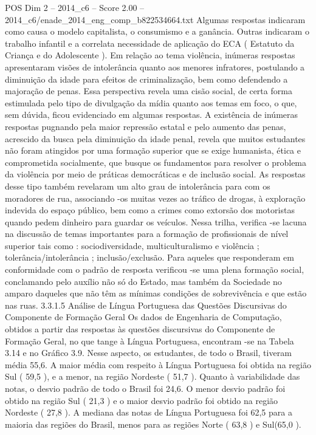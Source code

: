 \begin{textsample}{POS Dim 2 – 2014\_c6 – Score 2.00 – 2014\_c6/enade\_2014\_eng\_comp\_b822534664.txt}
Algumas respostas indicaram como causa o modelo capitalista, o consumismo e a ganância.
Outras indicaram o trabalho infantil e a correlata necessidade de aplicação do ECA ( Estatuto da Criança e do Adolescente ).
Em relação ao tema violência, inúmeras respostas apresentaram visões de intolerância quanto aos menores infratores, postulando a diminuição da idade para efeitos de criminalização, bem como defendendo a majoração de penas.
Essa perspectiva revela uma cisão social, de certa forma estimulada pelo tipo de divulgação da mídia quanto aos temas em foco, o que, sem dúvida, ficou evidenciado em algumas respostas.
A existência de inúmeras respostas pugnando pela maior repressão estatal e pelo aumento das penas, acrescido da busca pela diminuição da idade penal, revela que muitos estudantes não foram atingidos por uma formação superior que se exige humanista, ética e comprometida socialmente, que busque os fundamentos para resolver o problema da violência por meio de práticas democráticas e de inclusão social.
As respostas desse tipo também revelaram um alto grau de intolerância para com os moradores de rua, associando -os muitas vezes ao tráfico de drogas, à exploração indevida do espaço público, bem como a crimes como extorsão dos motoristas quando pedem dinheiro para guardar os veículos.
Nessa trilha, verifica -se lacuna na discussão de temas importantes para a formação de profissionais de nível superior tais como : sociodiversidade, multiculturalismo e violência ; tolerância/intolerância ; inclusão/exclusão.
Para aqueles que responderam em conformidade com o padrão de resposta verificou -se uma plena formação social, conclamando pelo auxílio não só do Estado, mas também da Sociedade no amparo daqueles que não têm as mínimas condições de sobrevivência e que estão nas ruas. 3.3.1.5 Análise de Língua Portuguesa das Questões Discursivas do Componente de Formação Geral Os dados de Engenharia de Computação, obtidos a partir das respostas às questões discursivas do Componente de Formação Geral, no que tange à Língua Portuguesa, encontram -se na Tabela 3.14 e no Gráfico 3.9.
Nesse aspecto, os estudantes, de todo o Brasil, tiveram média 55,6.
A maior média com respeito à Língua Portuguesa foi obtida na região Sul ( 59,5 ), e a menor, na região Nordeste ( 51,7 ).
Quanto à variabilidade das notas, o desvio padrão de todo o Brasil foi 24,6.
O menor desvio padrão foi obtido na região Sul ( 21,3 ) e o maior desvio padrão foi obtido na região Nordeste ( 27,8 ).
A mediana das notas de Língua Portuguesa foi 62,5 para a maioria das regiões do Brasil, menos para as regiões Norte ( 63,8 ) e Sul(65,0 ).

\end{textsample}
